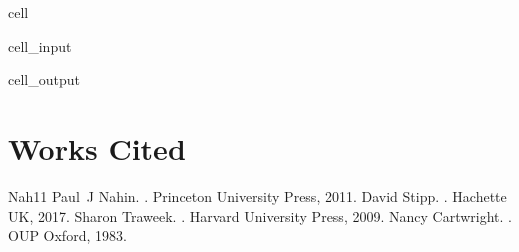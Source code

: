 \documentclass[letterpaper,10pt,english]{jupyterBook}
\begin{document}
\begin{sphinxuseclass}{cell}\begin{sphinxVerbatimInput}

\begin{sphinxuseclass}{cell_input}
\begin{sphinxVerbatim}[commandchars=\\\{\}]
\end{sphinxVerbatim}

\end{sphinxuseclass}\end{sphinxVerbatimInput}
\begin{sphinxVerbatimOutput}

\begin{sphinxuseclass}{cell_output}
\begin{sphinxVerbatim}
\end{sphinxVerbatim}

\noindent{}

\end{sphinxuseclass}\end{sphinxVerbatimOutput}

\end{sphinxuseclass}
\sphinxstepscope


\chapter{Works Cited}
\label{\detokenize{content/X_additional_pages/references-page:works-cited}}\label{\detokenize{content/X_additional_pages/references-page::doc}}
\begin{sphinxthebibliography}{Nah11}
\sphinxAtStartPar
Paul J Nahin. . Princeton University Press, 2011.
\sphinxAtStartPar
David Stipp. . Hachette UK, 2017.
\sphinxAtStartPar
Sharon Traweek. . Harvard University Press, 2009.
\sphinxAtStartPar
Nancy Cartwright. . OUP Oxford, 1983.
\end{sphinxthebibliography}







\renewcommand{\indexname}{Index}
\printindex
\end{document}
